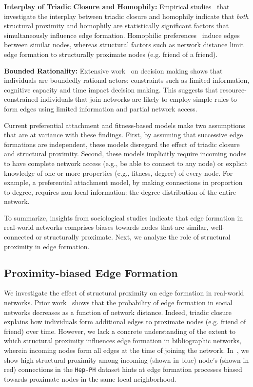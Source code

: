 \textbf{Interplay of Triadic Closure and Homophily:}
Empirical studies~\cite{35626,block2014multidimensional} that investigate the
interplay between triadic closure and homophily
  indicate
that \textit{both} structural proximity and homophily are statistically
significant factors that simultaneously influence edge formation.
Homophilic preferences~\cite{mcpherson2001birds} induce edges between similar
nodes, whereas structural factors such as network distance limit
edge formation to structurally proximate nodes (e.g. friend of a
friend).

\textbf{Bounded Rationality:}
Extensive work~\cite{simon1972theories,gigerenzer1996reasoning,lipman1995information} on
decision making shows that individuals are boundedly rational
actors; constraints such as limited information, cognitive capacity and time impact decision making.
This suggests that resource-constrained individuals that join networks are likely to employ simple rules
to form edges using limited information and partial network access.

Current preferential attachment and fitness-based models
\cite{dorogovtsev2000structure,singh2017relay,barabasi1999emergence}
make two assumptions that are at variance with these findings.
First, by assuming that successive edge formations are independent,
these models disregard the effect of triadic closure and structural proximity.
Second, these models implicitly require incoming nodes to have complete network
access (e.g., be able to connect to any node) or explicit knowledge of one or
more properties (e.g., fitness, degree) of every node. For
example, a preferential attachment model, by making connections in proportion to
degree, requires non-local information: the degree distribution of the entire
network.

To summarize, insights from sociological studies indicate that edge formation in real-world
networks comprises biases towards nodes that are similar, well-connected or
structurally proximate. Next, we analyze the role of structural proximity in edge
formation.

\subsection{Proximity-biased Edge Formation}

We investigate the effect of structural proximity on edge formation in real-world networks.
Prior work~\cite{35626} shows that the probability of edge formation in social networks
decreases as a function of network distance.
Indeed, triadic closure explains how individuals form additional
edges to proximate nodes (e.g. friend of friend) over time.
However, we lack a concrete understanding of the extent to which structural
proximity influences edge formation in bibliographic networks, wherein incoming nodes form all edges at
the time of joining the network. In~, we show high structural proximity
among incoming (shown in blue) node's (shown in red) connections in the \texttt{Hep-PH} dataset
hints at edge formation processes biased towards proximate nodes in the same local neighborhood.

